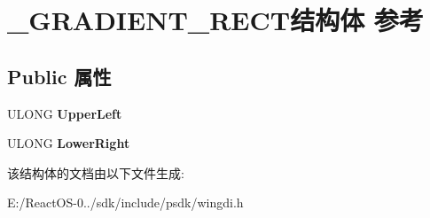 \hypertarget{struct___g_r_a_d_i_e_n_t___r_e_c_t}{}\section{\+\_\+\+G\+R\+A\+D\+I\+E\+N\+T\+\_\+\+R\+E\+C\+T结构体 参考}
\label{struct___g_r_a_d_i_e_n_t___r_e_c_t}
\subsection*{Public 属性}
\begin{DoxyCompactItemize}
\item 
\mbox{\label{struct___g_r_a_d_i_e_n_t___r_e_c_t_a8a94b876acac8412610632d391de01b6}} 
U\+L\+O\+NG {\bfseries Upper\+Left}
\item 
\mbox{\label{struct___g_r_a_d_i_e_n_t___r_e_c_t_a66910da0a7c09ba86fa593456d2e9b1b}} 
U\+L\+O\+NG {\bfseries Lower\+Right}
\end{DoxyCompactItemize}


该结构体的文档由以下文件生成\+:\begin{DoxyCompactItemize}
\item 
E\+:/\+React\+O\+S-\/0../sdk/include/psdk/wingdi.\+h\end{DoxyCompactItemize}
